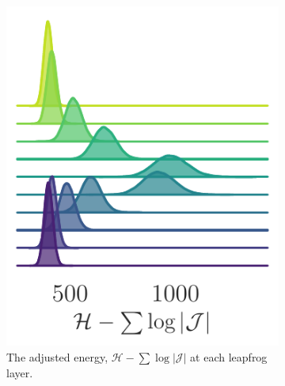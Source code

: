 \documentclass{article} %
\begin{document}
\begin{figure}[hbpt]
\begin{subfigure}[t]{0.315\textwidth}
      \includegraphics[width=\textwidth]{figures/ridgeplots/hwf.pdf}
      \caption{\label{fig:hwf}The adjusted energy, \(\mathcal{H}-\sum\log|\mathcal{J}|\) at each leapfrog layer.}
   \end{subfigure}
   \hfill
   \begin{subfigure}[t]{0.315\textwidth}

\end{subfigure}
\end{figure}
\end{document}
